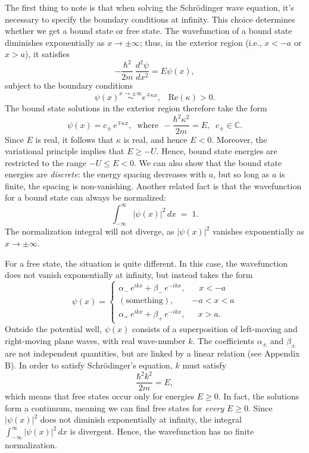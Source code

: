 \documentclass[pra,12pt]{revtex4}
\begin{document}
The first thing to note is that when solving the Schr\"odinger wave
equation, it's necessary to specify the boundary conditions at
infinity.  This choice determines whether we get a bound state or free
state.  The wavefunction of a bound state diminishes exponentially as
$x \rightarrow \pm\infty$; thus, in the exterior region (i.e., $x <
-a$ or $x > a$), it satisfies
\begin{equation}
  -\frac{\hbar^2}{2m}\,\frac{d^2\psi}{dx^2} = E \psi(x),
\end{equation}
subject to the boundary conditions
\begin{equation}
  \psi(x) \overset{x\rightarrow\pm\infty}{\sim} e^{\mp\kappa x}, \;\;\;\mathrm{Re}(\kappa) > 0.
\end{equation}
The bound state solutions in the exterior region therefore take the
form
\begin{equation}
  \psi(x) = c_\pm\, e^{\mp\kappa x}, \;\;\mathrm{where}\;\, -\frac{\hbar^2\kappa^2}{2m} = E, \;\; c_\pm \in \mathbb{C}.
\end{equation}
Since $E$ is real, it follows that $\kappa$ is real, and hence $E <
0$.  Moreover, the variational principle implies that $E \ge -U$.
Hence, bound state energies are restricted to the range $-U \le E <
0$.  We can also show that the bound state energies are
\textit{discrete}: the energy spacing decreases with $a$, but so long
as $a$ is finite, the spacing is non-vanishing.  Another related
fact is that the wavefunction for a bound state can always be
normalized:
\begin{equation}
  \int_{-\infty}^\infty |\psi(x)|^2\, dx\; =\; 1.
\end{equation}
The normalization integral will not diverge, as $|\psi(x)|^2$ vanishes
exponentially as $x \rightarrow \pm \infty$.

For a free state, the situation is quite different.  In this case, the
wavefunction does not vanish exponentially at infinity, but instead
takes the form
\begin{equation}
  \psi(x) = \begin{cases} \alpha_-\, e^{ik x} + \beta_-\, e^{-ik x}, & \;\;\;x < -a\\ (\mathrm{something}) , & -a < x < a\\ \alpha_+\, e^{ik x} + \beta_+\, e^{-ik x} , & \;\;\,x > a.\end{cases}
\end{equation}
Outside the potential well, $\psi(x)$ consists of a superposition of
left-moving and right-moving plane waves, with real wave-number $k$.  The
coefficients $\alpha_\pm$ and $\beta_\pm$ are not independent
quantities, but are linked by a linear relation (see Appendix B).  In
order to satisfy Schr\"odinger's equation, $k$ must satisfy
\begin{equation}
  \frac{\hbar^2k^2}{2m} = E,
\end{equation}
which means that free states occur only for energies $E \ge 0$.  In
fact, the solutions form a continuum, meaning we can find free states
for \textit{every} $E \ge 0$.  Since $|\psi(x)|^2$ does not diminish
exponentially at infinity, the integral $\int_{-\infty}^\infty
|\psi(x)|^2\, dx$ is divergent.  Hence, the wavefunction has no finite
normalization.
\end{document}
